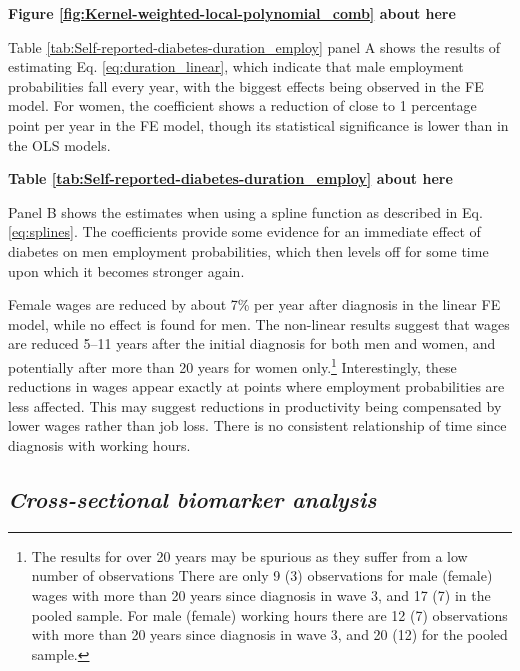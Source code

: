 \documentclass[12pt,english]{article}
\begin{document}
\begin{center}
	\textbf{Figure \ref{fig:Kernel-weighted-local-polynomial_comb} about here}
\end{center}


Table \ref{tab:Self-reported-diabetes-duration_employ} panel A shows the results of estimating Eq. \ref{eq:duration_linear}, which indicate that male employment probabilities fall every year, with the biggest effects being observed in the \ac{FE} model. For women, the coefficient shows a reduction of close to 1 percentage point per year in the \ac{FE} model, though its statistical significance is lower than in the \ac{OLS} models. 



\begin{center}
	\textbf{Table \ref{tab:Self-reported-diabetes-duration_employ} about here}
\end{center}


Panel B shows the estimates when using a spline function as described in Eq. \ref{eq:splines}. The coefficients provide some evidence for an immediate effect of diabetes on men employment probabilities, which then levels off for some time upon which it becomes stronger again.

Female wages are reduced by about 7\% per year after diagnosis in the linear \ac{FE} model, while no effect is found for men. The non-linear results suggest that wages are reduced 5--11 years after the initial diagnosis for both men and women, and potentially after more than 20 years for women only.\footnote{The results for over 20 years may be spurious as they suffer from a low number of observations There are only 9 (3) observations for male (female) wages with more than 20 years since diagnosis in wave 3, and 17 (7) in the pooled sample. For male (female) working hours there are 12 (7) observations with more than 20 years since diagnosis in wave 3, and 20 (12) for the pooled sample.} Interestingly, these reductions in wages appear exactly at points where employment probabilities are less affected. This may suggest reductions in productivity being compensated by lower wages rather than job loss. There is no consistent relationship of time since diagnosis with working hours.


\FloatBarrier

\subsection{\textit{Cross-sectional biomarker analysis}}
\end{document}

